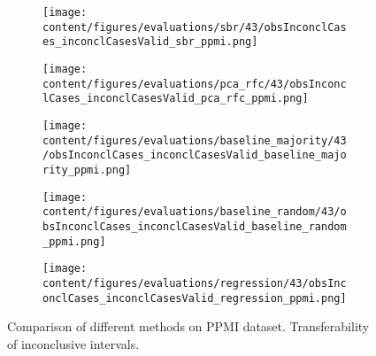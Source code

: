 \begin{figure}[ht]
  \begin{subfigure}{0.5\textwidth}
    \centering
    \texttt{[image: content/figures/evaluations/sbr/43/obsInconclCases\_inconclCasesValid\_sbr\_ppmi.png]}
  \end{subfigure}
  \hfill
  \begin{subfigure}{0.5\textwidth}
    \centering
    \texttt{[image: content/figures/evaluations/pca\_rfc/43/obsInconclCases\_inconclCasesValid\_pca\_rfc\_ppmi.png]}
  \end{subfigure}
  \hfill
  \begin{subfigure}{0.5\textwidth}
    \centering
    \texttt{[image: content/figures/evaluations/baseline\_majority/43/obsInconclCases\_inconclCasesValid\_baseline\_majority\_ppmi.png]}
  \end{subfigure}
  \hfill
  \begin{subfigure}{0.5\textwidth}
    \centering
    \texttt{[image: content/figures/evaluations/baseline\_random/43/obsInconclCases\_inconclCasesValid\_baseline\_random\_ppmi.png]}
  \end{subfigure}
  \hfill
  \begin{subfigure}{0.5\textwidth}
    \centering
    \texttt{[image: content/figures/evaluations/regression/43/obsInconclCases\_inconclCasesValid\_regression\_ppmi.png]}
  \end{subfigure}

  \caption{Comparison of different methods on PPMI dataset. Transferability of inconclusive intervals.}
  \label{fig:test_interval_match_ppmi}
\end{figure}

